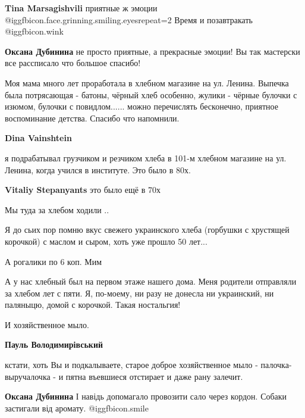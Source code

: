 \begin{itemize}
\begin{itemize} %
\textbf{Tina Marsagishvili} приятные ж эмоции @igg{fbicon.face.grinning.smiling.eyes}{repeat=2}  Время и позавтракать @igg{fbicon.wink} 

\textbf{Оксана Дубинина} не просто приятные, а прекрасные эмоции! Вы так мастерски все рассписало что большое спасибо!
\end{itemize} %


Моя мама много лет проработала в хлебном магазине на ул. Ленина. Выпечка была
потрясающая - батоны, чёрный хлеб особенно, жулики - чёрные булочки с изюмом,
булочки с повидлом...... можно перечислять бесконечно, приятное воспоминание
детства. Спасибо что напомнили.

\begin{itemize} %
\textbf{Dina Vainshtein} 

я подрабатывал грузчиком и резчиком хлеба в 101-м хлебном магазине на ул.
Ленина, когда учился в институте. Это было в 80х.

\textbf{Vitaliy Stepanyants} это было ещё в 70х

Мы туда за хлебом ходили ..
\end{itemize} %


Я до сьих пор помню вкус свежего украинского хлеба (горбушки с хрустящей
корочкой) с маслом и сыром, хоть уже прошло 50 лет...

А рогалики по 6 коп. Мим


А у нас хлебный был на первом этаже нашего дома. Меня родители отправляли за
хлебом лет с пяти. Я, по-моему, ни разу не донесла ни украинский, ни паляныцю,
домой с корочкой. Такая ностальгия!


И хозяйственное мыло.

\begin{itemize} %
\textbf{Пауль Володимирівський} 

кстати, хоть Вы и подкалываете, старое доброе хозяйственное мыло -
палочка-выручалочка - и пятна въевшиеся отстирает и даже рану залечит.

\begin{itemize} %
\textbf{Оксана Дубинина}
І навідь допомагало провозити сало через кордон. Собаки застигали від аромату.
 @igg{fbicon.smile} 


\end{itemize}
\end{itemize}
\end{itemize}
